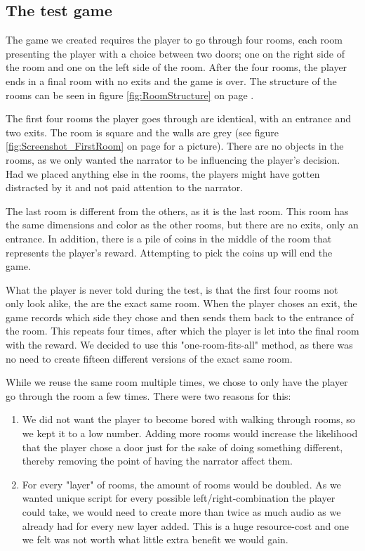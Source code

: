 \subsection{The test game}
\label{Method_Game}

The game we created requires the player to go through four rooms, each room presenting the player with a choice between two doors; one on the right side of the room and one on the left side of the room. After the four rooms, the player ends in a final room with no exits and the game is over. The structure of the rooms can be seen in figure \ref{fig:RoomStructure} on page \pageref{fig:RoomStructure}.


The first four rooms the player goes through are identical, with an entrance and two exits. The room is square and the walls are grey (see figure \ref{fig:Screenshot_FirstRoom} on page \pageref{fig:Screenshot_FirstRoom} for a picture). There are no objects in the rooms, as we only wanted the narrator to be influencing the player's decision. Had we placed anything else in the rooms, the players might have gotten distracted by it and not paid attention to the narrator.


The last room is different from the others, as it is the last room. This room has the same dimensions and color as the other rooms, but there are no exits, only an entrance. In addition, there is a pile of coins in the middle of the room that represents the player's reward. Attempting to pick the coins up will end the game.

What the player is never told during the test, is that the first four rooms not only look alike, the are the exact same room. When the player choses an exit, the game records which side they chose and then sends them back to the entrance of the room. This repeats four times, after which the player is let into the final room with the reward. We decided to use this "one-room-fits-all" method, as there was no need to create fifteen different versions of the exact same room.

While we reuse the same room multiple times, we chose to only have the player go through the room a few times. There were two reasons for this:
\begin{enumerate}
	\item We did not want the player to become bored with walking through rooms, so we kept it to a low number. Adding more rooms would increase the likelihood that the player chose a door just for the sake of doing something different, thereby removing the point of having the narrator affect them.
	\item For every "layer" of rooms, the amount of rooms would be doubled. As we wanted unique script for every possible left/right-combination the player could take, we would need to create more than twice as much audio as we already had for every new layer added. This is a huge resource-cost and one we felt was not worth what little extra benefit we would gain.
\end{enumerate}

